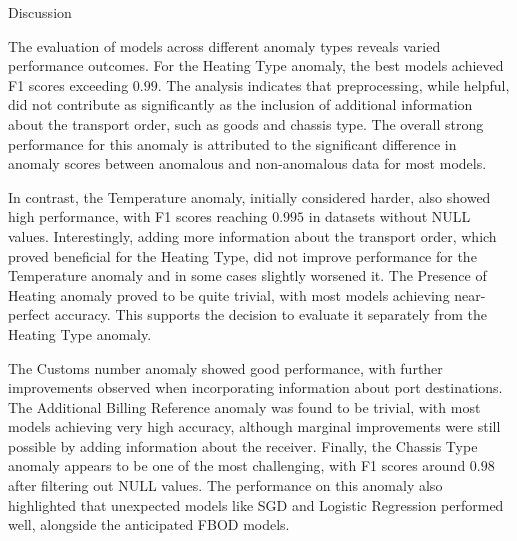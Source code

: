 \sec Discussion

The evaluation of models across different anomaly types reveals varied performance outcomes. For the Heating Type anomaly, the best models achieved F1 scores exceeding $0.99$. The analysis indicates that preprocessing, while helpful, did not contribute as significantly as the inclusion of additional information about the transport order, such as goods and chassis type. The overall strong performance for this anomaly is attributed to the significant difference in anomaly scores between anomalous and non-anomalous data for most models.

In contrast, the Temperature anomaly, initially considered harder, also showed high performance, with F1 scores reaching $0.995$ in datasets without NULL values. Interestingly, adding more information about the transport order, which proved beneficial for the Heating Type, did not improve performance for the Temperature anomaly and in some cases slightly worsened it. The Presence of Heating anomaly proved to be quite trivial, with most models achieving near-perfect accuracy. This supports the decision to evaluate it separately from the Heating Type anomaly.

The Customs number anomaly showed good performance, with further improvements observed when incorporating information about port destinations. The Additional Billing Reference anomaly was found to be trivial, with most models achieving very high accuracy, although marginal improvements were still possible by adding information about the receiver. Finally, the Chassis Type anomaly appears to be one of the most challenging, with F1 scores around $0.98$ after filtering out NULL values. The performance on this anomaly also highlighted that unexpected models like SGD and Logistic Regression performed well, alongside the anticipated FBOD models.